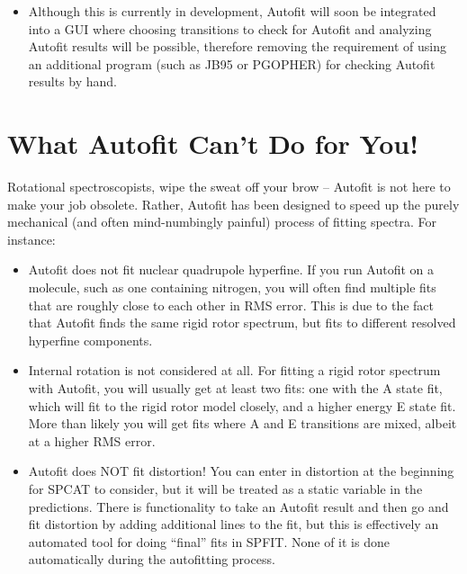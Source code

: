 \documentclass[letterpaper,10pt,english]{sphinxmanual}
\begin{document}
\begin{itemize}
\begin{itemize}
\end{itemize}

\item {} 
Although this is currently in development, Autofit will soon be integrated into a GUI where choosing transitions to check for Autofit and analyzing Autofit results will be possible, therefore removing the requirement of using an additional program (such as JB95 or PGOPHER) for checking Autofit results by hand.

\end{itemize}


\section{What Autofit Can't Do for You!}
\label{intro:what-autofit-can-t-do-for-you}
Rotational spectroscopists, wipe the sweat off your brow -- Autofit is not here to make your job obsolete. Rather, Autofit has been designed to speed up the purely mechanical (and often mind-numbingly painful) process of fitting spectra.
For instance:
\begin{itemize}
\item {} 
Autofit does not fit nuclear quadrupole hyperfine. If you run Autofit on a molecule, such as one containing nitrogen, you will often find multiple fits that are roughly close to each other in RMS error. This is due to the fact that Autofit finds the same rigid rotor spectrum, but fits to different resolved hyperfine components.

\item {} 
Internal rotation is not considered at all. For fitting a rigid rotor spectrum with Autofit, you will usually get at least two fits: one with the A state fit, which will fit to the rigid rotor model closely, and a higher energy E state fit. More than likely you will get fits where A and E transitions are mixed, albeit at a higher RMS error.

\item {} 
Autofit does NOT fit distortion! You can enter in distortion at the beginning for SPCAT to consider, but it will be treated as a static variable in the predictions. There is functionality to take an Autofit result and then go and fit distortion by adding additional lines to the fit, but this is effectively an automated tool for doing ``final'' fits in SPFIT. None of it is done automatically during the autofitting process.

\end{itemize}
\end{document}
